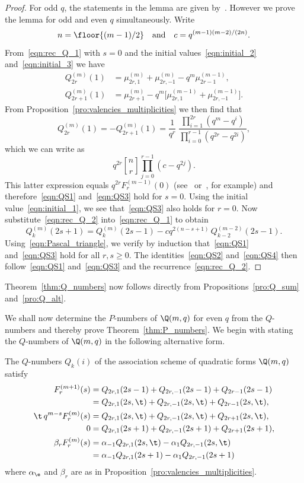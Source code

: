 \begin{proof}
For odd $q$, the statements in the lemma are given by~\cite[Lemma~6.2]{Sch2015}. However we prove the lemma for odd and even $q$ simultaneously. Write 
\[
n=\floor{(m-1)/2}\quad\text{and}\quad c=q^{(m-1)(m-2)/(2n)}.
\]
From~\eqref{eqn:rec_Q_1} with $s=0$ and the initial values~\eqref{eqn:initial_2} and~\eqref{eqn:initial_3} we have
\begin{align*}
Q^{(m)}_{2r}(1)  &=\mu^{(m)}_{2r,1}+\mu^{(m)}_{2r,-1}-q^m\mu^{(m-1)}_{2r-1},\\
Q^{(m)}_{2r+1}(1)&=\mu^{(m)}_{2r+1}-q^m\big[\mu^{(m-1)}_{2r,1}+\mu^{(m-1)}_{2r,-1}\big].
\end{align*}
From Proposition~\ref{pro:valencies_multiplicities} we then find that
\[
Q^{(m)}_{2r}(1)=-Q^{(m)}_{2r+1}(1)=\frac{1}{q^r}\;\frac{\prod\limits_{i=1}^{2r}(q^m-q^i)}{\prod\limits_{i=0}^{r-1}(q^{2r}-q^{2i})},
\]
which we can write as
\[
q^{2r}\genfrac{[}{]}{0pt}{}{n}{r}\prod_{j=0}^{r-1}(c-q^{2j}).
\]
This latter expression equals $q^{2r}F^{(m-1)}_r(0)$ (see~\cite{DelGoe1975} or~\cite{Sch2015}, for example) and therefore~\eqref{eqn:QS1} and~\eqref{eqn:QS3} hold for $s=0$. Using the initial value~\eqref{eqn:initial_1}, we see that~\eqref{eqn:QS3} also holds for $r=0$. Now substitute~\eqref{eqn:rec_Q_2} into~\eqref{eqn:rec_Q_1} to obtain
\[
Q^{(m)}_k(2s+1)=Q^{(m)}_k(2s-1)-cq^{2(n-s+1)}\,Q^{(m-2)}_{k-2}(2s-1).
\]
Using~\eqref{eqn:Pascal_triangle}, we verify by induction that~\eqref{eqn:QS1} and~\eqref{eqn:QS3} hold for all $r,s\ge 0$. The identities~\eqref{eqn:QS2} and~\eqref{eqn:QS4} then follow~\eqref{eqn:QS1} and~\eqref{eqn:QS3} and the recurrence~\eqref{eqn:rec_Q_2}. 
\end{proof}
\par
Theorem~\ref{thm:Q_numbers} now follows directly from Propositions~\ref{pro:Q_sum} and~\ref{pro:Q_alt}.
\par
We shall now determine the $P$-numbers of $\Q(m,q)$ for even $q$ from the $Q$-numbers and thereby prove Theorem~\ref{thm:P_numbers}. We begin with stating the $Q$-numbers of $\Q(m,q)$ in the following alternative form.
\begin{prop}
\label{pro:Q_numbers_sums}
The $Q$-numbers $Q_k(i)$ of the association scheme of quadratic forms $\Q(m,q)$ satisfy
\begin{align}
F^{(m+1)}_r(s)&=Q_{2r,1}(2s-1)+Q_{2r,-1}(2s-1)+Q_{2r-1}(2s-1)   \label{eqn:Q_sum_1}\\
&=Q_{2r,1}(2s,\t)+Q_{2r,-1}(2s,\t)+Q_{2r-1}(2s,\t),   \nonumber\\%
\t\,q^{m-s}F^{(m)}_r(s)&=Q_{2r,1}(2s,\t)+Q_{2r,-1}(2s,\t)+Q_{2r+1}(2s,\t),   \label{eqn:Q_sum_2}\\
0&=Q_{2r,1}(2s+1)+Q_{2r,-1}(2s+1)+Q_{2r+1}(2s+1),   \label{eqn:Q_sum_2b}\\%
\beta_rF^{(m)}_r(s)&=\alpha_{-1}Q_{2r,1}(2s,\t)-\alpha_1 Q_{2r,-1}(2s,\t)   \label{eqn:Q_sum_3}\\
&=\alpha_{-1}Q_{2r,1}(2s+1)-\alpha_1Q_{2r,-1}(2s+1)   \nonumber
\end{align}
where $\alpha_\e$ and $\beta_r$ are as in Proposition~\ref{pro:valencies_multiplicities}.
\end{prop}
